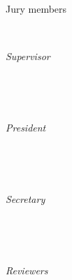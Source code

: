 \begin{titlepage}
	\vfill
  \begin{minipage}[t]{.27\textwidth}
    \raggedleft \hfill
  \end{minipage}
  \hspace*{15pt}
  \begin{minipage}[t]{.65\textwidth}
    { \small Jury members }
  \end{minipage} \\[3mm]
	\begin{minipage}[t]{.27\textwidth}
		\raggedleft
		\textit{Supervisor}
	\end{minipage}
	\hspace*{15pt}
	\begin{minipage}[t]{.65\textwidth}
		{ \Large \thesisFirstSupervisor } \\
    { \small \thesisFirstSupervisorUniversity }
	\end{minipage} \\[3mm]
	\begin{minipage}[t]{.27\textwidth}
		\raggedleft
		\textit{President}
	\end{minipage}
	\hspace*{15pt}
	\begin{minipage}[t]{.65\textwidth}
		{ \Large \thesisFirstReviewer } \\
	  { \small \thesisFirstReviewerUniversity }
	\end{minipage} \\[3mm]
	\begin{minipage}[t]{.27\textwidth}
		\raggedleft
		\textit{Secretary}
	\end{minipage}
	\hspace*{15pt}
	\begin{minipage}[t]{.65\textwidth}
		{ \Large \thesisSecondReviewer } \\
	  { \small \thesisSecondReviewerUniversity }
	\end{minipage} \\[3mm]
	\begin{minipage}[t]{.27\textwidth}
		\raggedleft
		\textit{Reviewers}
	\end{minipage}
	\hspace*{15pt}
	\begin{minipage}[t]{.65\textwidth}
		{ \Large \thesisThirdReviewer } \\
	  { \small \thesisThirdReviewerUniversity } \\[3mm]
		{ \Large \thesisFourthReviewer } \\
	  { \small \thesisFourthReviewerUniversity } \\[3mm]
		{ \Large \thesisFifthReviewer } \\
	  { \small \thesisFifthReviewerUniversity } \\[3mm]
		{ \Large \thesisSixthReviewer } \\
	  { \small \thesisSixthReviewerUniversity }
	\end{minipage} \\[10mm]

	\thesisDate \\

\end{titlepage}

